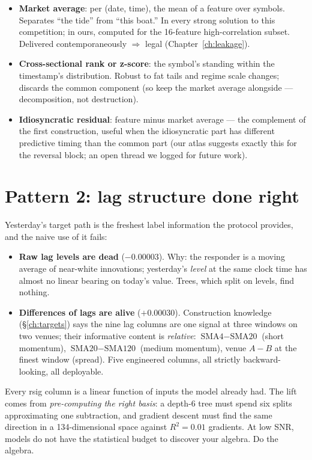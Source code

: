 \begin{itemize}
\item \textbf{Market average}: per (date, time), the mean of a feature over
  symbols. Separates ``the tide'' from ``this boat.'' In every strong
  solution to this competition; in ours, computed for the 16-feature
  high-correlation subset. Delivered contemporaneously $\Rightarrow$ legal
  (Chapter~\ref{ch:leakage}).
\item \textbf{Cross-sectional rank or z-score}: the symbol's standing
  within the timestamp's distribution. Robust to fat tails and regime
  scale changes; discards the common component (so keep the market average
  alongside --- decomposition, not destruction).
\item \textbf{Idiosyncratic residual}: feature minus market average ---
  the complement of the first construction, useful when the idiosyncratic
  part has different predictive timing than the common part (our atlas
  suggests exactly this for the reversal block; an open thread we logged
  for future work).
\end{itemize}

\section{Pattern 2: lag structure done right}

Yesterday's target path is the freshest label information the protocol
provides, and the naive use of it fails:

\begin{itemize}
\item \textbf{Raw lag levels are dead} ($-0.00003$). Why: the responder is
  a moving average of near-white innovations; yesterday's \emph{level} at
  the same clock time has almost no linear bearing on today's value.
  Trees, which split on levels, find nothing.
\item \textbf{Differences of lags are alive} ($+0.00030$). Construction
  knowledge (\S\ref{ch:targets}) says the nine lag columns are one signal
  at three windows on two venues; their informative content is
  \emph{relative}: $\text{SMA4}-\text{SMA20}$ (short momentum),
  $\text{SMA20}-\text{SMA120}$ (medium momentum), venue $A - B$ at the
  finest window (spread). Five engineered columns, all strictly
  backward-looking, all deployable.
\end{itemize}

\begin{keybox}
Every rsig column is a linear function of inputs the model already had.
The lift comes from \emph{pre-computing the right basis}: a depth-6 tree
must spend six splits approximating one subtraction, and gradient descent
must find the same direction in a 134-dimensional space against
$R^2=0.01$ gradients. At low SNR, models do not have the statistical
budget to discover your algebra. Do the algebra.
\end{keybox}

